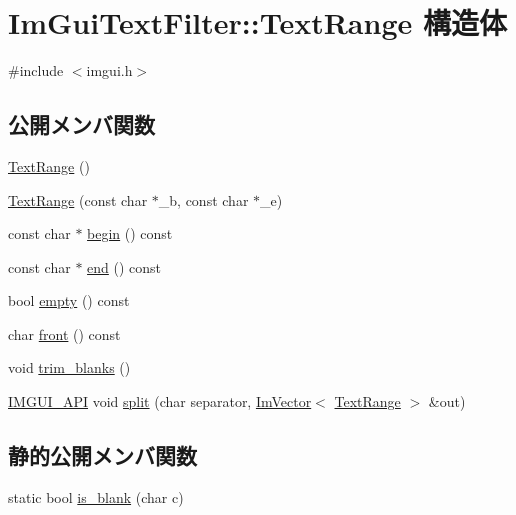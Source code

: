 \hypertarget{struct_im_gui_text_filter_1_1_text_range}{}\section{Im\+Gui\+Text\+Filter\+:\+:Text\+Range 構造体}
\label{struct_im_gui_text_filter_1_1_text_range}


{\ttfamily \#include $<$imgui.\+h$>$}

\subsection*{公開メンバ関数}
\begin{DoxyCompactItemize}
\item 
\mbox{\hyperlink{struct_im_gui_text_filter_1_1_text_range_a5a6548fd40884ef5837e6a1ffa33af61}{Text\+Range}} ()
\item 
\mbox{\hyperlink{struct_im_gui_text_filter_1_1_text_range_a4a2b377d4fd141fc3664378041f9f007}{Text\+Range}} (const char $\ast$\+\_\+b, const char $\ast$\+\_\+e)
\item 
const char $\ast$ \mbox{\hyperlink{struct_im_gui_text_filter_1_1_text_range_ab6b04c316f081e8ad7b044a8afbda63c}{begin}} () const
\item 
const char $\ast$ \mbox{\hyperlink{struct_im_gui_text_filter_1_1_text_range_aa5d60286f4c35bfdde82219ff079de9e}{end}} () const
\item 
bool \mbox{\hyperlink{struct_im_gui_text_filter_1_1_text_range_ab8d74e3b0ce63997746828e4b8ae3bbf}{empty}} () const
\item 
char \mbox{\hyperlink{struct_im_gui_text_filter_1_1_text_range_a7d0b405b4db5d33351812b4b3b6e9107}{front}} () const
\item 
void \mbox{\hyperlink{struct_im_gui_text_filter_1_1_text_range_aa3bbd8b17b528f548d73c0936228dc85}{trim\+\_\+blanks}} ()
\item 
\mbox{\hyperlink{imgui_8h_a43829975e84e45d1149597467a14bbf5}{I\+M\+G\+U\+I\+\_\+\+A\+PI}} void \mbox{\hyperlink{struct_im_gui_text_filter_1_1_text_range_a9e0a0d6079e10128cde4d89c04b8f566}{split}} (char separator, \mbox{\hyperlink{class_im_vector}{Im\+Vector}}$<$ \mbox{\hyperlink{struct_im_gui_text_filter_1_1_text_range}{Text\+Range}} $>$ \&out)
\end{DoxyCompactItemize}
\subsection*{静的公開メンバ関数}
\begin{DoxyCompactItemize}
\item 
static bool \mbox{\hyperlink{struct_im_gui_text_filter_1_1_text_range_ade5e15395ae2bcef6b37bf22a68cc6e6}{is\+\_\+blank}} (char c)
\end{DoxyCompactItemize}
